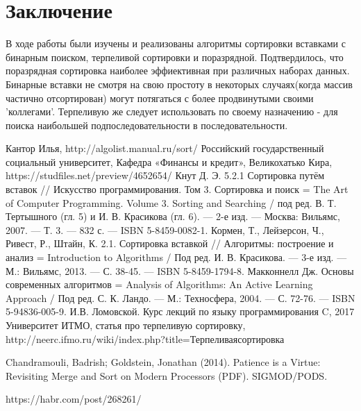 \documentclass[a4paper, 14pt]{article}
\begin{document}
	\section*{Заключение}
    
	\hspace{1cm}В ходе работы были изучены и реализованы алгоритмы сортировки вставками с бинарным поиском, терпеливой сортировки и поразрядной. Подтвердилось, что поразрядная сортировка наиболее эффиективная при различных наборах данных. Бинарные вставки не смотря на свою простоту в некоторых случаях(когда массив частично отсортирован) могут потягаться с более продвинутыми своими 'коллегами'. Терпеливую же следует использовать по своему назначению - для поиска наибольшей подпоследовательности в последовательности.
    

    \newpage

    \begin{thebibliography}{11} 
     Кантор Илья, http://algolist.manual.ru/sort/ 
     Российский государственный социальный университет, Кафедра «Финансы и кредит», Великохатько Кира, https://studfiles.net/preview/4652654/
    Кнут Д. Э. 5.2.1 Сортировка путём вставок // Искусство программирования. Том 3. Сортировка и поиск = The Art of Computer Programming. Volume 3. Sorting and Searching / под ред. В. Т. Тертышного (гл. 5) и И. В. Красикова (гл. 6). — 2-е изд. — Москва: Вильямс, 2007. — Т. 3. — 832 с. — ISBN 5-8459-0082-1.
    Кормен, Т., Лейзерсон, Ч., Ривест, Р., Штайн, К. 2.1. Сортировка вставкой // Алгоритмы: построение и анализ = Introduction to Algorithms / Под ред. И. В. Красикова. — 3-е изд. — М.: Вильямс, 2013. — С. 38-45. — ISBN 5-8459-1794-8.
      Макконнелл Дж. Основы современных алгоритмов = Analysis of Algorithms: An Active Learning Approach / Под ред. С. К. Ландо. — М.: Техносфера, 2004. — С. 72-76. — ISBN 5-94836-005-9.
    И.В. Ломовской. Курс лекций по языку программирования C, 2017
     Университет ИТМО, статья про терпеливую сортировку, http://neerc.ifmo.ru/wiki/index.php?title=Терпеливаясортировка
   
     Chandramouli, Badrish; Goldstein, Jonathan (2014). Patience is a Virtue: Revisiting Merge and Sort on Modern Processors (PDF). SIGMOD/PODS. 
    
    https://habr.com/post/268261/
    
    \end{thebibliography}
\end{document}
